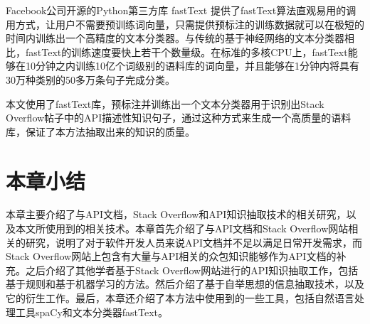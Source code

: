 Facebook公司开源的Python第三方库 fastText 提供了fastText算法直观易用的调用方式，让用户不需要预训练词向量，只需提供预标注的训练数据就可以在极短的时间内训练出一个高精度的文本分类器。与传统的基于神经网络的文本分类器相比，fastText的训练速度要快上若干个数量级。在标准的多核CPU上，fastText能够在10分钟之内训练10亿个词级别的语料库的词向量，并且能够在1分钟内将具有30万种类别的50多万条句子完成分类。

本文使用了fastText库，预标注并训练出一个文本分类器用于识别出Stack Overflow帖子中的API描述性知识句子，通过这种方式来生成一个高质量的语料库，保证了本方法抽取出来的知识的质量。

\section{本章小结}
本章主要介绍了与API文档，Stack Overflow和API知识抽取技术的相关研究，以及本文所使用到的相关技术。本章首先介绍了与API文档和Stack Overflow网站相关的研究，说明了对于软件开发人员来说API文档并不足以满足日常开发需求，而Stack Overflow网站上包含有大量与API相关的众包知识能够作为API文档的补充。之后介绍了其他学者基于Stack Overflow网站进行的API知识抽取工作，包括基于规则和基于机器学习的方法。然后介绍了基于自举思想的信息抽取技术，以及它的衍生工作。最后，本章还介绍了本方法中使用到的一些工具，包括自然语言处理工具spaCy和文本分类器fastText。
